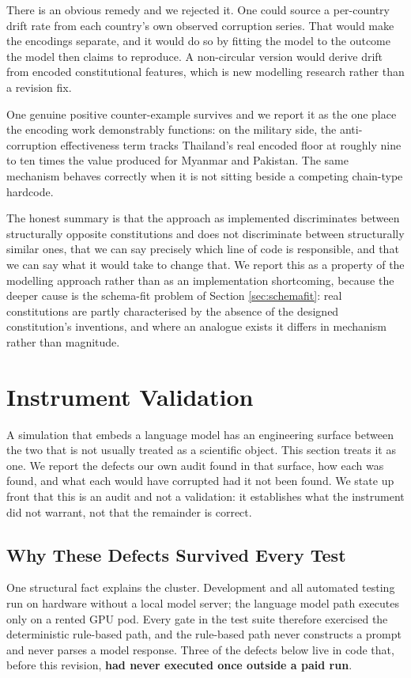 \documentclass{ieeeaccess}
\begin{document}
There is an obvious remedy and we rejected it. One could source a
per-country drift rate from each country's own observed corruption
series. That would make the encodings separate, and it would do so by
fitting the model to the outcome the model then claims to reproduce. A
non-circular version would derive drift from encoded constitutional
features, which is new modelling research rather than a revision fix.

One genuine positive counter-example survives and we report it as the
one place the encoding work demonstrably functions: on the military
side, the anti-corruption effectiveness term tracks Thailand's real
encoded floor at roughly nine to ten times the value produced for
Myanmar and Pakistan. The same mechanism behaves correctly when it is
not sitting beside a competing chain-type hardcode.

The honest summary is that the approach as implemented discriminates
between structurally opposite constitutions and does not discriminate
between structurally similar ones, that we can say precisely which line
of code is responsible, and that we can say what it would take to change
that. We report this as a property of the modelling approach rather than
as an implementation shortcoming, because the deeper cause is the
schema-fit problem of Section \ref{sec:schemafit}: real constitutions
are partly characterised by the absence of the designed constitution's
inventions, and where an analogue exists it differs in mechanism rather
than magnitude.

\section{Instrument Validation}
\label{sec:instrument}

A simulation that embeds a language model has an engineering surface
between the two that is not usually treated as a scientific object. This
section treats it as one. We report the defects our own audit found in
that surface, how each was found, and what each would have corrupted had
it not been found. We state up front that this is an audit and not a
validation: it establishes what the instrument did not warrant, not that
the remainder is correct.

\subsection{Why These Defects Survived Every Test}
One structural fact explains the cluster. Development and all automated
testing run on hardware without a local model server; the language model
path executes only on a rented GPU pod. Every gate in the test suite
therefore exercised the deterministic rule-based path, and the
rule-based path never constructs a prompt and never parses a model
response. Three of the defects below live in code that, before this
revision, \textbf{had never executed once outside a paid run}.
\end{document}
